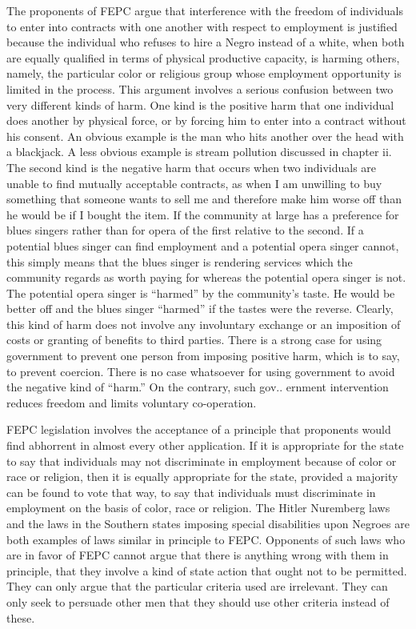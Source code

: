 \documentclass[11pt,openany]{book}
\begin{document}
The proponents of FEPC argue that interference with the freedom of individuals to enter into contracts with one another with respect to employment is justified because the individual who refuses to hire a Negro instead of a white, when both are equally qualified in terms of physical productive capacity, is harming others, namely, the particular color or religious group whose employment opportunity is limited in the process. This argument involves a serious confusion between two very different kinds of harm. One kind is the positive harm that one individual does another by physical force, or by forcing him to enter into a contract without his consent. An obvious example is the man who hits another over the head with a blackjack. A less obvious example is stream pollution discussed in chapter ii. The second kind is the negative harm that occurs when two individuals are unable to find mutually acceptable contracts, as when I am unwilling to buy something that someone wants to sell me and therefore make him worse off than he would be if I bought the item. If the community at large has a preference for blues singers rather than for opera of the first relative to the second. If a potential blues singer can find employment and a potential opera singer cannot, this simply means that the blues singer is rendering services which the community regards as worth paying for whereas the potential opera singer is not. The potential opera singer is ``harmed'' by the community's taste. He would be better off and the blues singer ``harmed'' if the tastes were the reverse. Clearly, this kind of harm does not involve any involuntary exchange or an imposition of costs or granting of benefits to third parties. There is a strong case for using government to prevent one person from imposing positive harm, which is to say, to prevent coercion. There is no case whatsoever for using government to avoid the negative kind of ``harm.'' On the contrary, such gov.. ernment intervention reduces freedom and limits voluntary co-operation.

FEPC legislation involves the acceptance of a principle that proponents would find abhorrent in almost every other application. If it is appropriate for the state to say that individuals may not discriminate in employment because of color or race or religion, then it is equally appropriate for the state, provided a majority can be found to vote that way, to say that individuals must discriminate in employment on the basis of color, race or religion. The Hitler Nuremberg laws and the laws in the Southern states imposing special disabilities upon Negroes are both examples of laws similar in principle to FEPC. Opponents of such laws who are in favor of FEPC cannot argue that there is anything wrong with them in principle, that they involve a kind of state action that ought not to be permitted. They can only argue that the particular criteria used are irrelevant. They can only seek to persuade other men that they should use other criteria instead of these.
\end{document}
